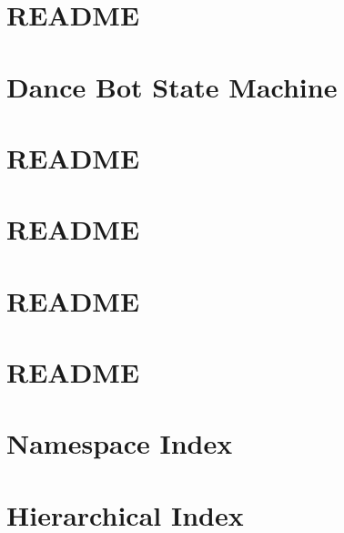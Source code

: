 \documentclass[twoside]{book}
\newcommand{\+}{\discretionary{\mbox{\scriptsize$\hookleftarrow$}}{}{}}
\begin{document}
\chapter{R\+E\+A\+D\+ME}
\label{md_smacc_sm_reference_library_sm_dance_bot_2_README}
\hypertarget{md_smacc_sm_reference_library_sm_dance_bot_2_README}{}

\chapter{Dance Bot State Machine}
\label{md_smacc_sm_reference_library_sm_dance_bot_3_launch_readme}
\hypertarget{md_smacc_sm_reference_library_sm_dance_bot_3_launch_readme}{}

\chapter{R\+E\+A\+D\+ME}
\label{md_smacc_sm_reference_library_sm_dance_bot_3_README}
\hypertarget{md_smacc_sm_reference_library_sm_dance_bot_3_README}{}

\chapter{R\+E\+A\+D\+ME}
\label{md_smacc_sm_reference_library_sm_packML_README}
\hypertarget{md_smacc_sm_reference_library_sm_packML_README}{}

\chapter{R\+E\+A\+D\+ME}
\label{md_smacc_sm_reference_library_sm_three_some_README}
\hypertarget{md_smacc_sm_reference_library_sm_three_some_README}{}

\chapter{R\+E\+A\+D\+ME}
\label{md_smacc_sm_reference_library_sm_viewer_sim_README}
\hypertarget{md_smacc_sm_reference_library_sm_viewer_sim_README}{}

\chapter{Namespace Index}

\chapter{Hierarchical Index}

\end{document}
